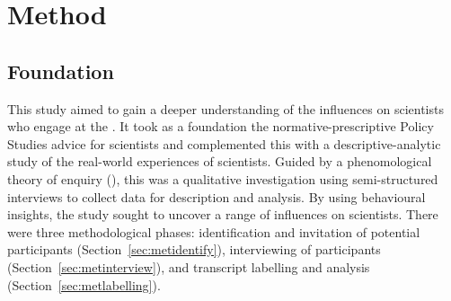 \chapter{Method}\label{ch:methods}

\section{Foundation}\label{sec:metmotivation}

This study aimed to gain a deeper understanding of the influences on scientists who engage at the \CAN{} \SPI. It took as a foundation the normative-prescriptive Policy Studies advice for scientists and complemented this with a descriptive-analytic study of the real-world experiences of scientists. 
Guided by a phenomological theory of enquiry (\cite{CreswellP2017}), this was a qualitative investigation using semi-structured interviews to collect data for description and analysis. 
By using behavioural insights, the study sought to uncover a range of influences on scientists. %
There were three methodological phases: identification and invitation of potential participants (Section~\ref{sec:metidentify}), interviewing of participants (Section~\ref{sec:metinterview}), and transcript labelling and analysis (Section~\ref{sec:metlabelling}).



